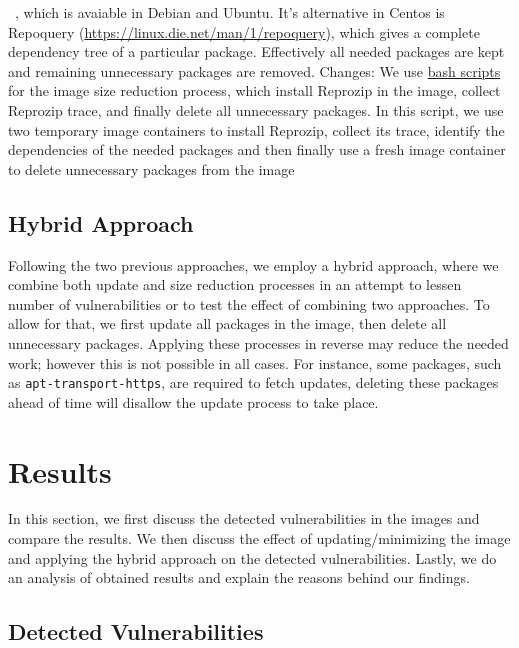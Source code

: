 \documentclass[a4paper,num-refs]{oup-contemporary}
\newcommand{\change}[2]{\color{cyan}Changes: #1\color{black}}
\begin{document}
~\cite{debtree}, which is avaiable in Debian and Ubuntu. It's alternative in Centos is Repoquery (\url{https://linux.die.net/man/1/repoquery}), which
gives a complete dependency tree of a particular package.
Effectively all needed packages are kept and remaining unnecessary packages are removed. \change{We use
\href{https://github.com/kaurbhupinder/Vulnerability-Analysis/tree/master/Scripts/minification}{bash scripts} for
the image size reduction process, which install Reprozip in the image, collect Reprozip trace, and
finally delete all unnecessary packages. In this script, we use two temporary
image containers to install Reprozip, collect its trace,
identify the dependencies of the needed packages and then finally use
a fresh image container to
delete unnecessary packages from the image}.

\subsection{Hybrid Approach}

Following the two previous approaches, we employ a hybrid approach, where
we combine both update and size reduction processes in an attempt to
lessen number of vulnerabilities or to test the effect of
combining two approaches. To allow for that, we first update all packages in
the image, then delete all unnecessary packages. Applying these processes in reverse
may reduce the needed work; however this is not possible in all cases. For instance,
some packages, such as \texttt{apt-transport-https}, are required to fetch updates, deleting these packages
ahead of time will disallow the update process to take place.
\vspace*{-2mm}
\section{Results}

In this section,
we first discuss the detected vulnerabilities in the images and compare the
results. We then discuss the effect of updating/minimizing the image and applying the hybrid
approach on the detected vulnerabilities.
Lastly, we do an analysis of obtained results and explain the reasons behind our
findings.
\vspace*{-2mm}
\subsection{Detected Vulnerabilities}
\end{document}
